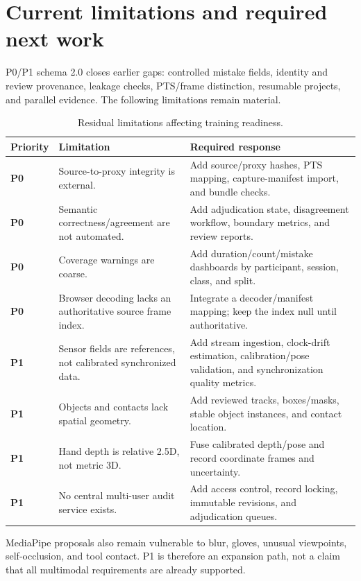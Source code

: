 \documentclass[10pt]{article}
\newcommand{\priority}[1]{\textbf{\color{orange}#1}}
\begin{document}
\section{Current limitations and required next work}

P0/P1 schema 2.0 closes earlier gaps: controlled mistake fields, identity and
review provenance, leakage checks, PTS/frame distinction, resumable projects,
and parallel evidence. The following limitations remain material.

\begin{table}[H]
\centering
\caption{Residual limitations affecting training readiness.}
\small
\begin{tabularx}{\textwidth}{@{}p{}p{}Y@{}}
\toprule
\textbf{Priority} & \textbf{Limitation} & \textbf{Required response}\\
\midrule
\priority{P0} & Source-to-proxy integrity is external. &
Add source/proxy hashes, PTS mapping, capture-manifest import, and bundle checks.\\
\priority{P0} & Semantic correctness/agreement are not automated. &
Add adjudication state, disagreement workflow, boundary metrics, and review reports.\\
\priority{P0} & Coverage warnings are coarse. &
Add duration/count/mistake dashboards by participant, session, class, and split.\\
\priority{P0} & Browser decoding lacks an authoritative source frame index. &
Integrate a decoder/manifest mapping; keep the index null until authoritative.\\
\priority{P1} & Sensor fields are references, not calibrated synchronized data. &
Add stream ingestion, clock-drift estimation, calibration/pose validation, and
synchronization quality metrics.\\
\priority{P1} & Objects and contacts lack spatial geometry. &
Add reviewed tracks, boxes/masks, stable object instances, and contact location.\\
\priority{P1} & Hand depth is relative 2.5D, not metric 3D. &
Fuse calibrated depth/pose and record coordinate frames and uncertainty.\\
\priority{P1} & No central multi-user audit service exists. &
Add access control, record locking, immutable revisions, and adjudication queues.\\
\bottomrule
\end{tabularx}
\end{table}

MediaPipe proposals also remain vulnerable to blur, gloves, unusual viewpoints,
self-occlusion, and tool contact. P1 is therefore an expansion path, not a claim
that all multimodal requirements are already supported.
\end{document}
